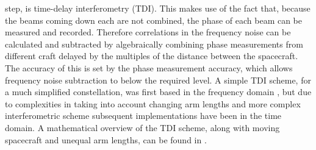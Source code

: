 \documentclass{article}
\begin{document}
step, is time-delay interferometry (TDI). This makes use of the fact that,
because the beams coming down each are not combined, the phase of each beam can
be measured and recorded. Therefore correlations in the frequency noise can be
calculated and subtracted by algebraically combining phase measurements from
different craft delayed by the multiples of the distance between the spacecraft.
The accuracy of this is set by the phase measurement accuracy, which allows
frequency noise subtraction to below the required level. A simple TDI scheme,
for a much simplified constellation, was first based in the frequency domain
\cite{Giampieri}, but due to complexities in taking into account changing arm
lengths and more complex interferometric scheme subsequent implementations have
been in the time domain. A mathematical overview of the TDI scheme, along with
moving spacecraft and unequal arm lengths, can be found in \cite{Tinto:2005}.
\end{document}
